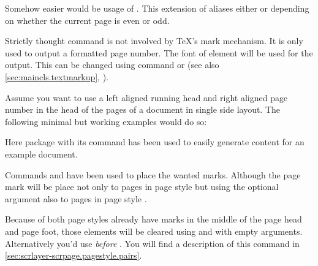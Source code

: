 Somehow easier would be usage of . This extension of
 aliases either  or 
depending on whether the current page is even or odd.

Strictly thought command  is not involved by \TeX's mark
mechanism. It is only used to output a formatted page number.
%
The font of element
 will be used for
the output. This can be changed using command  or
 (see also \autoref{sec:maincls.textmarkup},
).%
%
\ifCommonscrlayerscrpage%
\begin{Example}
  Assume\label{example.scrlayer-scrpage.headmark} you want to use a left
  aligned running head and right aligned page
  number in the head of the pages of a document in single side layout. The
  following minimal but working examples would do so:
  Here package  with its command
   has been used to easily
  generate content for an example document.

  Commands  and  have been used to place the wanted
  marks. Although the page mark will be place not only to pages in page style
   but using the optional argument also to pages in
  page style .

  Because of both page styles already have marks in the middle of the page
  head and page foot, those elements will be cleared using  and
   with empty arguments. Alternatively you'd use
   \emph{before} . You will find a
  description of this command in
  \autoref{sec:scrlayer-scrpage.pagestyle.pairs}.
\end{Example}

